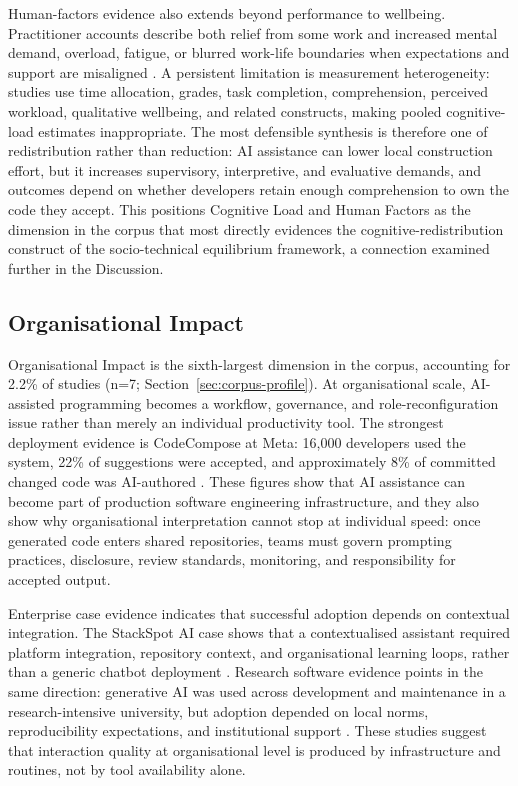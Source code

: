 Human-factors evidence also extends beyond performance to wellbeing. Practitioner accounts describe both relief from some work and increased mental demand, overload, fatigue, or blurred work-life boundaries when expectations and support are misaligned \cite{meem_investigating_2025}. A persistent limitation is measurement heterogeneity: studies use time allocation, grades, task completion, comprehension, perceived workload, qualitative wellbeing, and related constructs, making pooled cognitive-load estimates inappropriate. The most defensible synthesis is therefore one of redistribution rather than reduction: AI assistance can lower local construction effort, but it increases supervisory, interpretive, and evaluative demands, and outcomes depend on whether developers retain enough comprehension to own the code they accept. This positions Cognitive Load and Human Factors as the dimension in the corpus that most directly evidences the cognitive-redistribution construct of the socio-technical equilibrium framework, a connection examined further in the Discussion.

\subsection{Organisational Impact}
\label{sec:organisational}
Organisational Impact is the sixth-largest dimension in the corpus, accounting for 2.2\% of studies (n=7; Section~\ref{sec:corpus-profile}). At organisational scale, AI-assisted programming becomes a workflow, governance, and role-reconfiguration issue rather than merely an individual productivity tool. The strongest deployment evidence is CodeCompose at Meta: 16,000 developers used the system, 22\% of suggestions were accepted, and approximately 8\% of committed changed code was AI-authored \cite{murali_ai-assisted_2024}. These figures show that AI assistance can become part of production software engineering infrastructure, and they also show why organisational interpretation cannot stop at individual speed: once generated code enters shared repositories, teams must govern prompting practices, disclosure, review standards, monitoring, and responsibility for accepted output.

Enterprise case evidence indicates that successful adoption depends on contextual integration. The StackSpot AI case shows that a contextualised assistant required platform integration, repository context, and organisational learning loops, rather than a generic chatbot deployment \cite{pinto_lessons_2024}. Research software evidence points in the same direction: generative AI was used across development and maintenance in a research-intensive university, but adoption depended on local norms, reproducibility expectations, and institutional support \cite{besser_how_2026}. These studies suggest that interaction quality at organisational level is produced by infrastructure and routines, not by tool availability alone.

